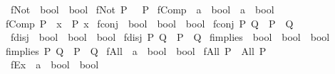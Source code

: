 \begin{isabellebody}
\ fNot\ {\isacharcolon}{\kern0pt}{\isacharcolon}{\kern0pt}\ {\isachardoublequoteopen}bool\ {\isasymRightarrow}\ bool{\isachardoublequoteclose}\ \isanewline
{\isachardoublequoteopen}fNot\ P\ {\isasymlongleftrightarrow}\ {\isasymnot}\ P{\isachardoublequoteclose}\isanewline
\isanewline
{}\isamarkupfalse%
\ fComp\ {\isacharcolon}{\kern0pt}{\isacharcolon}{\kern0pt}\ {\isachardoublequoteopen}{\isacharparenleft}{\kern0pt}{\isacharprime}{\kern0pt}a\ {\isasymRightarrow}\ bool{\isacharparenright}{\kern0pt}\ {\isasymRightarrow}\ {\isacharprime}{\kern0pt}a\ {\isasymRightarrow}\ bool{\isachardoublequoteclose}\ \isanewline
{\isachardoublequoteopen}fComp\ P\ {\isacharequal}{\kern0pt}\ {\isacharparenleft}{\kern0pt}{\isasymlambda}x{\isachardot}{\kern0pt}\ {\isasymnot}\ P\ x{\isacharparenright}{\kern0pt}{\isachardoublequoteclose}\isanewline
\isanewline
{}\isamarkupfalse%
\ fconj\ {\isacharcolon}{\kern0pt}{\isacharcolon}{\kern0pt}\ {\isachardoublequoteopen}bool\ {\isasymRightarrow}\ bool\ {\isasymRightarrow}\ bool{\isachardoublequoteclose}\ \isanewline
{\isachardoublequoteopen}fconj\ P\ Q\ {\isasymlongleftrightarrow}\ P\ {\isasymand}\ Q{\isachardoublequoteclose}\isanewline
\isanewline
{}\isamarkupfalse%
\ fdisj\ {\isacharcolon}{\kern0pt}{\isacharcolon}{\kern0pt}\ {\isachardoublequoteopen}bool\ {\isasymRightarrow}\ bool\ {\isasymRightarrow}\ bool{\isachardoublequoteclose}\ \isanewline
{\isachardoublequoteopen}fdisj\ P\ Q\ {\isasymlongleftrightarrow}\ P\ {\isasymor}\ Q{\isachardoublequoteclose}\isanewline
\isanewline
{}\isamarkupfalse%
\ fimplies\ {\isacharcolon}{\kern0pt}{\isacharcolon}{\kern0pt}\ {\isachardoublequoteopen}bool\ {\isasymRightarrow}\ bool\ {\isasymRightarrow}\ bool{\isachardoublequoteclose}\ \isanewline
{\isachardoublequoteopen}fimplies\ P\ Q\ {\isasymlongleftrightarrow}\ {\isacharparenleft}{\kern0pt}P\ {\isasymlongrightarrow}\ Q{\isacharparenright}{\kern0pt}{\isachardoublequoteclose}\isanewline
\isanewline
{}\isamarkupfalse%
\ fAll\ {\isacharcolon}{\kern0pt}{\isacharcolon}{\kern0pt}\ {\isachardoublequoteopen}{\isacharparenleft}{\kern0pt}{\isacharprime}{\kern0pt}a\ {\isasymRightarrow}\ bool{\isacharparenright}{\kern0pt}\ {\isasymRightarrow}\ bool{\isachardoublequoteclose}\ \isanewline
{\isachardoublequoteopen}fAll\ P\ {\isasymlongleftrightarrow}\ All\ P{\isachardoublequoteclose}\isanewline
\isanewline
{}\isamarkupfalse%
\ fEx\ {\isacharcolon}{\kern0pt}{\isacharcolon}{\kern0pt}\ {\isachardoublequoteopen}{\isacharparenleft}{\kern0pt}{\isacharprime}{\kern0pt}a\ {\isasymRightarrow}\ bool{\isacharparenright}{\kern0pt}\ {\isasymRightarrow}\ bool{\isachardoublequoteclose}\ \isanewline

\end{isabellebody}
